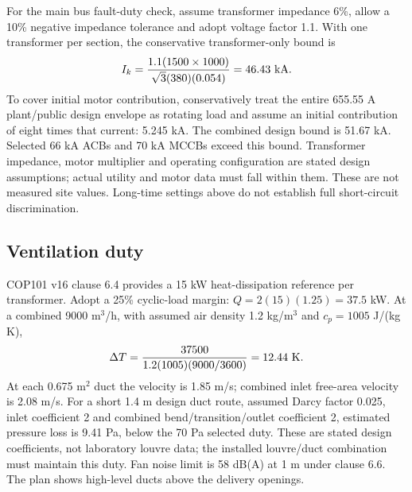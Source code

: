 For the main bus fault-duty check, assume transformer impedance 6\%, allow a 10\% negative impedance tolerance and adopt voltage factor 1.1. With one transformer per section, the conservative transformer-only bound is
\[
I_{k}=\frac{1.1(1500\times1000)}{\sqrt3(380)(0.054)}=46.43\ {\rm kA}.
\]
To cover initial motor contribution, conservatively treat the entire 655.55 A plant/public design envelope as rotating load and assume an initial contribution of eight times that current: 5.245 kA. The combined design bound is 51.67 kA. Selected 66 kA ACBs and 70 kA MCCBs exceed this bound. Transformer impedance, motor multiplier and operating configuration are stated design assumptions; actual utility and motor data must fall within them. These are not measured site values. Long-time settings above do not establish full short-circuit discrimination.

\subsection*{Ventilation duty}
COP101 v16 clause 6.4 provides a 15 kW heat-dissipation reference per transformer. Adopt a 25\% cyclic-load margin: $Q=2(15)(1.25)=37.5$ kW. At a combined 9000 m$^3$/h, with assumed air density 1.2 kg/m$^3$ and $c_p=1005$ J/(kg K),
\[
\Delta T=\frac{37500}{1.2(1005)(9000/3600)}=12.44\ {\rm K}.
\]
At each 0.675 m$^2$ duct the velocity is 1.85 m/s; combined inlet free-area velocity is 2.08 m/s. For a short 1.4 m design duct route, assumed Darcy factor 0.025, inlet coefficient 2 and combined bend/transition/outlet coefficient 2, estimated pressure loss is 9.41 Pa, below the 70 Pa selected duty. These are stated design coefficients, not laboratory louvre data; the installed louvre/duct combination must maintain this duty. Fan noise limit is 58 dB(A) at 1 m under clause 6.6. The plan shows high-level ducts above the delivery openings.
